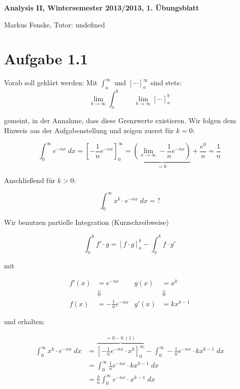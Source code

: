 \documentclass[a4paper,german,12pt,smallheadings]{scrartcl}
\begin{document}
\begin{center}
\bfseries %
\sffamily %
\vspace{-40pt}
Analysis II, Wintersemester 2013/2013, 1. Übungsblatt

Markus Fenske, Tutor: undefined
\vspace{-10pt}
\end{center}

\section*{Aufgabe 1.1}

Vorab soll geklärt werden: Mit $\int_{a}^{\infty}$ und $\left[\cdots\right]_a^\infty$ sind stets:
\begin{equation*}
\lim\limits_{b \to \infty}\int_{a}^{b} \quad \quad \lim\limits_{b \to \infty}\left[\cdots\right]_a^b
\end{equation*}

gemeint, in der Annahme, dass diese Grenzwerte existieren.
Wir folgen dem Hinweis aus der Aufgabenstellung und zeigen zuerst für $k=0$:

\begin{equation*}
  \int_0^\infty e^{-nx} \; dx = \left[ -\frac{1}{n} e^{-nx} \right]_0^\infty = \underbrace{\left(\lim_{x \to \infty} - \frac{1}{n} e^{-nx} \right)}_{=0} + \frac{e^0}{n} = \frac{1}{n}
\end{equation*}

Anschließend für $k > 0$:

\begin{equation*}
  \int_0^\infty x^k \cdot e^{-nx} \; dx = \text{?}
\end{equation*}

Wir benutzen partielle Integration (Kurzschreibweise)

\begin{equation*}
  \int_a^b f' \cdot g = \left[f \cdot g\right]_a^b - \int_a^b f \cdot g'
\end{equation*}

mit

\begin{align*}
  f'(x) &= e^{-nx} & g(x) &= x^k \\
        &\Downarrow & &\Downarrow\\
  f(x) &= -\frac{1}{n} e^{-nx} & g'(x) &= kx^{k-1}
\end{align*}

und erhalten:

\begin{align*}
  \int_0^\infty x^k \cdot e^{-nx} \; dx &= \overbrace{\left[-\frac{1}{n} e^{-nx} \cdot x^k\right]_0^\infty}^{=0-0\; (1)} - \int_0^\infty -\frac{1}{n}e^{-nx} \cdot kx^{k-1} \; dx \\
                                         &= \int_0^\infty \frac{1}{n}e^{-nx} \cdot kx^{k-1} \; dx \\
                                         &= \frac{k}{n} \int_0^\infty e^{-nx} \cdot x^{k-1} \; dx
\end{align*}
\end{document}
